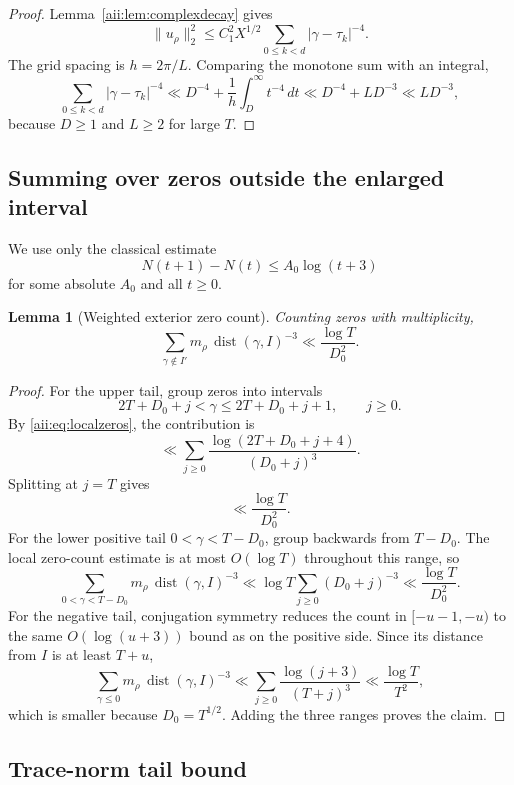 \documentclass[11pt]{article}
\newtheorem{lemma}[theorem]{Lemma}
\begin{document}
\begin{proof}
Lemma~\ref{aii:lem:complexdecay} gives
\[
 \|u_\rho\|_2^2
 \le
 C_1^2X^{1/2}
 \sum_{0\le k<d}|\gamma-\tau_k|^{-4}.
\]
The grid spacing is $h=2\pi/L$.  Comparing the monotone sum with an integral,
\[
 \sum_{0\le k<d}|\gamma-\tau_k|^{-4}
 \ll
 D^{-4}+\frac1h\int_D^\infty t^{-4}\,dt
 \ll
 D^{-4}+L D^{-3}
 \ll L D^{-3},
\]
because $D\ge1$ and $L\ge2$ for large $T$.
\end{proof}

\subsection{Summing over zeros outside the enlarged interval}

We use only the classical estimate
\begin{equation}\label{aii:eq:localzeros}
 N(t+1)-N(t)\le A_0\log(t+3)
\end{equation}
for some absolute $A_0$ and all $t\ge0$.

\begin{lemma}[Weighted exterior zero count]\label{aii:lem:zerotail}
Counting zeros with multiplicity,
\[
 \sum_{\gamma\notin I'}m_\rho\,
 \operatorname{dist}(\gamma,I)^{-3}
 \ll
 \frac{\log T}{D_0^2}.
\]
\end{lemma}

\begin{proof}
For the upper tail, group zeros into intervals
\[
 2T+D_0+j<\gamma\le2T+D_0+j+1,\qquad j\ge0.
\]
By \eqref{aii:eq:localzeros}, the contribution is
\[
 \ll
 \sum_{j\ge0}
 \frac{\log(2T+D_0+j+4)}{(D_0+j)^3}.
\]
Splitting at $j=T$ gives
\[
 \ll \frac{\log T}{D_0^2}.
\]
For the lower positive tail $0<\gamma<T-D_0$, group backwards from
$T-D_0$.  The local zero-count estimate is at most $O(\log T)$ throughout
this range, so
\[
 \sum_{0<\gamma<T-D_0}m_\rho\,
 \operatorname{dist}(\gamma,I)^{-3}
 \ll
 \log T\sum_{j\ge0}(D_0+j)^{-3}
 \ll\frac{\log T}{D_0^2}.
\]
For the negative tail, conjugation symmetry reduces the count in
$[-u-1,-u)$ to the same $O(\log(u+3))$ bound as on the positive side.
Since its distance from $I$ is at least $T+u$,
\[
 \sum_{\gamma\le0}m_\rho\,
 \operatorname{dist}(\gamma,I)^{-3}
 \ll
 \sum_{j\ge0}\frac{\log(j+3)}{(T+j)^3}
 \ll\frac{\log T}{T^2},
\]
which is smaller because $D_0=T^{1/2}$.  Adding the three ranges proves the
claim.
\end{proof}

\subsection{Trace-norm tail bound}
\end{document}
